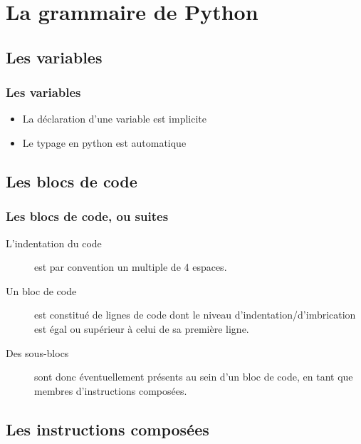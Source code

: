 \section{La grammaire de Python}

\subsection{Les variables}
\begin{frame}[fragile]
  \frametitle{Les variables}
  \begin{itemize}
  \item La déclaration d'une variable est implicite
  \item Le typage en python est automatique
  \end{itemize}
  \begin{ipython}
  \end{ipython}
\end{frame}


\subsection{Les blocs de code}
\begin{frame}[fragile]
  \frametitle{Les blocs de code, ou suites}
  \begin{description}
  \item[L'indentation du code] est par convention un multiple de 4 espaces. \pause
  \item[Un bloc de code] est constitué de lignes de code dont le niveau d'indentation/d'imbrication est égal ou supérieur à celui de sa première ligne. \pause
  \item[Des sous-blocs] sont donc éventuellement présents au sein d'un bloc de code, en tant que membres d'instructions composées.
  \end{description}
\end{frame}

\subsection{Les instructions composées}
